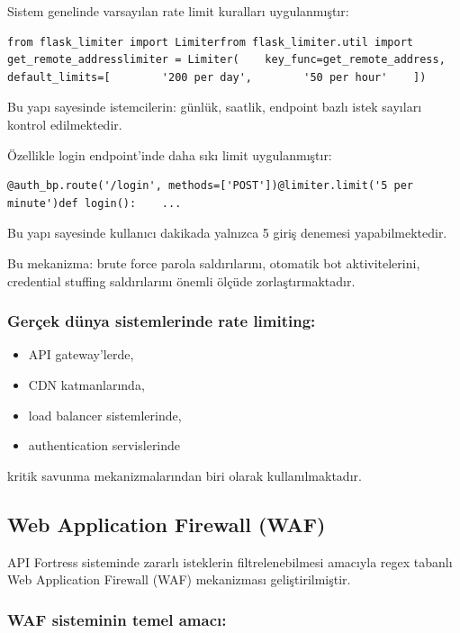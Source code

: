 Sistem genelinde varsayılan rate limit kuralları uygulanmıştır:

\begin{lstlisting}
from flask_limiter import Limiterfrom flask_limiter.util import get_remote_addresslimiter = Limiter(    key_func=get_remote_address,    default_limits=[        '200 per day',        '50 per hour'    ])
\end{lstlisting}

Bu yapı sayesinde istemcilerin: günlük, saatlik, endpoint bazlı istek sayıları kontrol edilmektedir.

Özellikle login endpoint’inde daha sıkı limit uygulanmıştır:

\begin{lstlisting}
@auth_bp.route('/login', methods=['POST'])@limiter.limit('5 per minute')def login():    ...
\end{lstlisting}

Bu yapı sayesinde kullanıcı dakikada yalnızca 5 giriş denemesi yapabilmektedir.

Bu mekanizma: brute force parola saldırılarını, otomatik bot aktivitelerini, credential stuffing saldırılarını önemli ölçüde zorlaştırmaktadır.

\subsubsection{Gerçek dünya sistemlerinde rate limiting:}

\begin{itemize}[leftmargin=*]
    \item API gateway’lerde,
    \item CDN katmanlarında,
    \item load balancer sistemlerinde,
    \item authentication servislerinde
\end{itemize}

kritik savunma mekanizmalarından biri olarak kullanılmaktadır.

\subsection{Web Application Firewall (WAF)}
\label{web-application-firewall-waf}

API Fortress sisteminde zararlı isteklerin filtrelenebilmesi amacıyla regex tabanlı Web Application Firewall (WAF) mekanizması geliştirilmiştir.

\subsubsection{WAF sisteminin temel amacı:}

